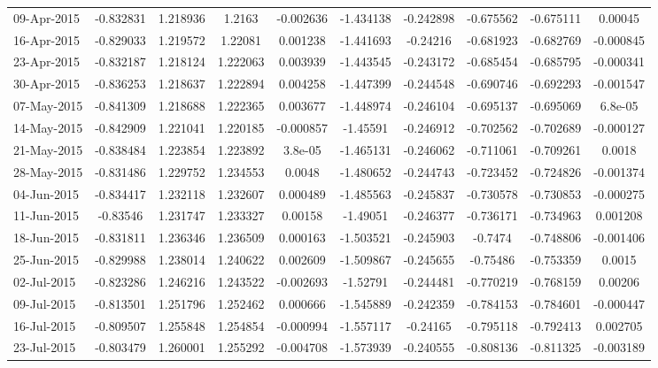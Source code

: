 \documentclass[letterpaper,11pt]{article}
\newcommand{\?}{\stackrel{?}{=}}
\begin{document}
\begin{table}[htbp]
\begin{adjustbox}{width=1.2\textwidth,center=\textwidth}
\begin{tabular}{ l  *9c }
09-Apr-2015 & -0.832831 & 1.218936 & 1.2163 & -0.002636 & -1.434138 & -0.242898 & -0.675562 & -0.675111 & 0.00045 \\
\rowcolor{black!10}16-Apr-2015 & -0.829033 & 1.219572 & 1.22081 & 0.001238 & -1.441693 & -0.24216 & -0.681923 & -0.682769 & -0.000845 \\
23-Apr-2015 & -0.832187 & 1.218124 & 1.222063 & 0.003939 & -1.443545 & -0.243172 & -0.685454 & -0.685795 & -0.000341 \\
\rowcolor{black!10}30-Apr-2015 & -0.836253 & 1.218637 & 1.222894 & 0.004258 & -1.447399 & -0.244548 & -0.690746 & -0.692293 & -0.001547 \\
07-May-2015 & -0.841309 & 1.218688 & 1.222365 & 0.003677 & -1.448974 & -0.246104 & -0.695137 & -0.695069 & 6.8e-05 \\
\rowcolor{black!10}14-May-2015 & -0.842909 & 1.221041 & 1.220185 & -0.000857 & -1.45591 & -0.246912 & -0.702562 & -0.702689 & -0.000127 \\
21-May-2015 & -0.838484 & 1.223854 & 1.223892 & 3.8e-05 & -1.465131 & -0.246062 & -0.711061 & -0.709261 & 0.0018 \\
\rowcolor{black!10}28-May-2015 & -0.831486 & 1.229752 & 1.234553 & 0.0048 & -1.480652 & -0.244743 & -0.723452 & -0.724826 & -0.001374 \\
04-Jun-2015 & -0.834417 & 1.232118 & 1.232607 & 0.000489 & -1.485563 & -0.245837 & -0.730578 & -0.730853 & -0.000275 \\
\rowcolor{black!10}11-Jun-2015 & -0.83546 & 1.231747 & 1.233327 & 0.00158 & -1.49051 & -0.246377 & -0.736171 & -0.734963 & 0.001208 \\
18-Jun-2015 & -0.831811 & 1.236346 & 1.236509 & 0.000163 & -1.503521 & -0.245903 & -0.7474 & -0.748806 & -0.001406 \\
\rowcolor{black!10}25-Jun-2015 & -0.829988 & 1.238014 & 1.240622 & 0.002609 & -1.509867 & -0.245655 & -0.75486 & -0.753359 & 0.0015 \\
02-Jul-2015 & -0.823286 & 1.246216 & 1.243522 & -0.002693 & -1.52791 & -0.244481 & -0.770219 & -0.768159 & 0.00206 \\
\rowcolor{black!10}09-Jul-2015 & -0.813501 & 1.251796 & 1.252462 & 0.000666 & -1.545889 & -0.242359 & -0.784153 & -0.784601 & -0.000447 \\
16-Jul-2015 & -0.809507 & 1.255848 & 1.254854 & -0.000994 & -1.557117 & -0.24165 & -0.795118 & -0.792413 & 0.002705 \\
\rowcolor{black!10}23-Jul-2015 & -0.803479 & 1.260001 & 1.255292 & -0.004708 & -1.573939 & -0.240555 & -0.808136 & -0.811325 & -0.003189 \\

\end{tabular}
\end{adjustbox}
\end{table}
\end{document}
